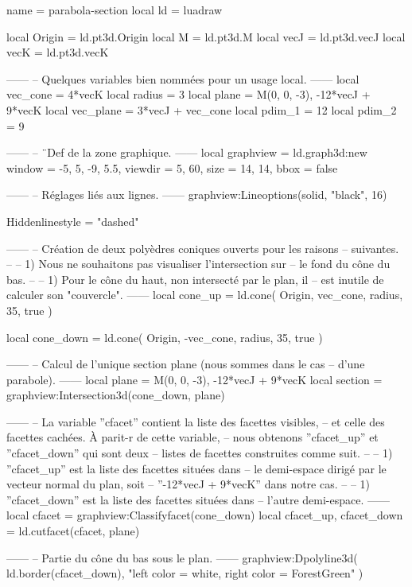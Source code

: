 \documentclass[border = 3pt]{standalone}
\begin{document}
\begin{luadraw*}{name = parabola-section}
local ld = luadraw

local Origin = ld.pt3d.Origin
local M      = ld.pt3d.M
local vecJ   = ld.pt3d.vecJ
local vecK   = ld.pt3d.vecK

------
-- Quelques variables bien nommées pour un usage local.
------
local vec_cone  = 4*vecK
local radius  = 3
local plane   = {M(0, 0, -3), -12*vecJ + 9*vecK}
local vec_plane = 3*vecJ + vec_cone
local pdim_1  = 12
local pdim_2  = 9

------
-- ¨Def de la zone graphique.
------
local graphview = ld.graph3d:new{
  window  = {-5, 5, -9, 5.5},
  viewdir = {5, 60},
  size    = {14, 14},
  bbox    = false
}

------
-- Réglages liés aux lignes.
------
graphview:Lineoptions(solid, "black", 16)

Hiddenlinestyle = "dashed"

------
-- Création de deux polyèdres coniques ouverts pour les raisons
-- suivantes.
--
--     1) Nous ne souhaitons pas visualiser l'intersection sur
--     le fond du cône du bas.
--
--     1) Pour le cône du haut, non intersecté par le plan, il
--     est inutile de calculer son "couvercle".
------
local cone_up = ld.cone(
  Origin, vec_cone, radius,
  35,
  true
)

local cone_down = ld.cone(
  Origin, -vec_cone, radius,
  35,
  true
)

------
-- Calcul de l'unique section plane (nous sommes dans le cas
-- d'une parabole).
------
local plane   = {M(0, 0, -3), -12*vecJ + 9*vecK}
local section = graphview:Intersection3d(cone_down, plane)

------
-- La variable ''cfacet'' contient la liste des facettes visibles,
-- et celle des facettes cachées. À parit-r de cette variable,
-- nous obtenons ''cfacet_up'' et ''cfacet_down'' qui sont deux
-- listes de facettes construites comme suit.
--
--   1) ''cfacet_up'' est la liste des facettes situées dans
--   le demi-espace dirigé par le vecteur normal du plan, soit
--   ''-12*vecJ + 9*vecK'' dans notre cas.
--
--   1) ''cfacet_down'' est la liste des facettes situées dans
--   l’autre demi-espace.
------
local cfacet                 = graphview:Classifyfacet(cone_down)
local cfacet_up, cfacet_down = ld.cutfacet(cfacet, plane)

------
-- Partie du cône du bas sous le plan.
------
graphview:Dpolyline3d(
  ld.border(cfacet_down),
  "left color = white, right color = ForestGreen"
)


\end{luadraw*}
\end{document}

